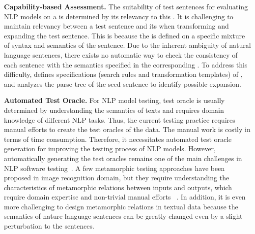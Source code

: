 
\noindent \textbf{Capability-based Assessment.} The suitability of test sentences for evaluating NLP
models on a \lc is determined by its relevancy to this
\lc. It is challenging to maintain relevancy between a test sentence and its \lc when transforming and expanding the test sentence.
This is because the \lc is defined on a specific 
mixture of syntax and semantics of the sentence. Due to the inherent ambiguity of natural language sentences, there exists no automatic way to check the consistency of each sentence with the semantics specified in the corresponding \lc. To address this difficulty, \tool defines specifications (search rules
and transformation templates) of \lcs, and analyzes the parse
tree of the seed sentence to identify possible expansion.

\noindent \textbf{Automated Test Oracle.}   For NLP model testing, test oracle is usually determined by understanding the semantics of texts and requires domain knowledge of different NLP tasks.
Thus, the current testing practice requires manual efforts to create the test oracles of the \ho data. The manual work is costly in terms of time consumption. Therefore, it necessitates automated test oracle generation for improving the testing process of NLP models. 
 However, automatically generating the  test oracles remains one of the main challenges in NLP software testing~\cite{huang2022aeon}. 
 A few metamorphic testing approaches have been proposed in image recognition domain, but they require understanding the characteristics of metamorphic relations between inputs and outputs, which require domain expertise and non-trivial manual efforts ~\cite{segura2016metamorphictest}. In addition, it is even more challenging to design metamorphic relations in textual data because the semantics of nature language sentences can be greatly changed even by a slight perturbation to the sentences.



